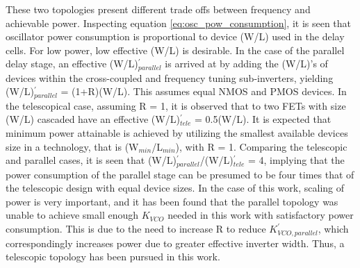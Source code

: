 			These two topologies present different trade offs between frequency and achievable power. Inspecting equation \ref{eq:osc_pow_consumption}, it is seen that oscillator power consumption is proportional to device (W/L) used in the delay cells. For low power, low effective (W/L) is desirable. In the case of the parallel delay stage, an effective (W/L)$_{parallel}^{'}$ is arrived at by adding the (W/L)'s of devices within the cross-coupled and frequency tuning sub-inverters, yielding (W/L)$_{parallel}^{'}$ = (1+R)(W/L). This assumes equal NMOS and PMOS devices. In the telescopical case, assuming R = 1, it is observed that to two FETs with size (W/L) cascaded have an effective (W/L)$_{tele}^{'}$ = 0.5(W/L). It is expected that minimum power attainable is achieved by utilizing the smallest available devices size in a technology, that is (W$_{min}$/L$_{min}$), with R = 1. Comparing the telescopic and parallel cases, it is seen that (W/L)$_{parallel}^{'}$/(W/L)$_{tele}^{'}$ = 4, implying that the power consumption of the parallel stage can be presumed to be four times that of the telescopic design with equal device sizes. In the case of this work, scaling of power is very important, and it has been found that the parallel topology was unable to achieve small enough $K_{VCO}$ needed in this work with satisfactory power consumption. This is due to the need to increase R to reduce $K_{VCO,parallel}^{'}$, which correspondingly increases power due to greater effective inverter width. Thus, a telescopic topology has been pursued in this work.

